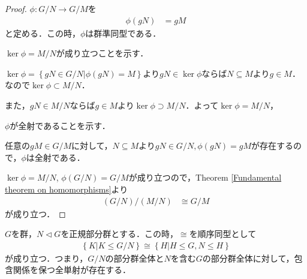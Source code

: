\begin{proof}
    $\phi : G/N\to G/M$を
    \begin{align}
        \phi(gN) &= gM
    \end{align}
    と定める．この時，$\phi$は群準同型である．

    $\ker\phi=M/N$が成り立つことを示す．

    $\ker\phi = \left\{ gN \in G/N | \phi(gN) = M\right\}$より$gN\in \ker\phi$ならば$N \subseteq M$より$g\in M$．なので$\ker\phi \subset M/N$．

    また，$gN\in M/N$ならば$g\in M$より$\ker\phi \supset M/N$．よって$\ker\phi=M/N$，

    $\phi$が全射であることを示す．

    任意の$gM\in G/M$に対して，$N \subseteq M$より$gN\in G/N,\phi(gN)=gM$が存在するので，$\phi$は全射である．

    $\ker\phi=M/N$, $\phi(G/N)=G/M$が成り立つので，Theorem \ref{Fundamental theorem on homomorphisms}より
    \begin{align}
        (G/N)/(M/N) &\cong G/M
    \end{align}
    が成り立つ．
\end{proof}
\begin{theorem}
$G$を群，$N\lhd G$を正規部分群とする．この時，$\cong $を順序同型として
    \begin{align}
        \left\{ K | K \leq  G/N\right\}\cong \left\{ H | H\leq  G , N \leq   H \right\}
    \end{align}
が成り立つ．つまり，$G/N$の部分群全体と$N$を含む$G$の部分群全体に対して，包含関係を保つ全単射が存在する．
\end{theorem}
